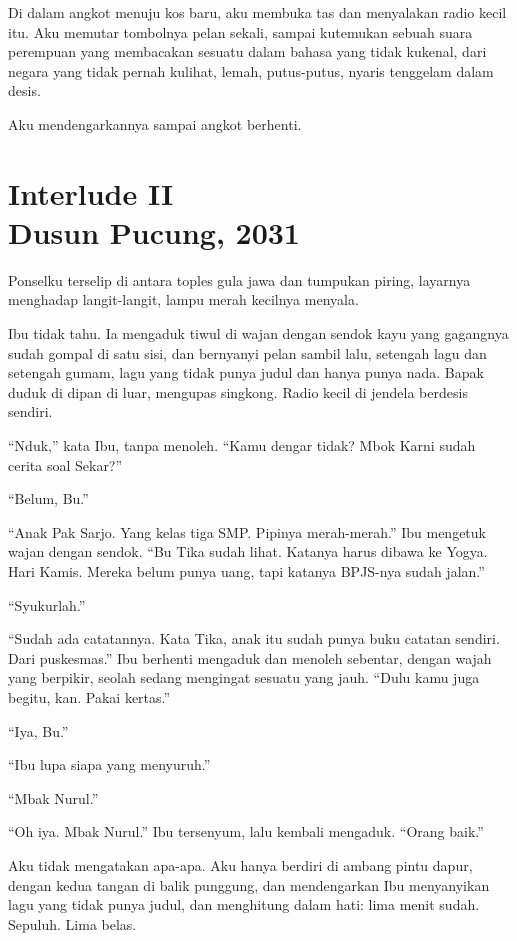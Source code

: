 \documentclass[11pt,twoside,openany]{book}
\begin{document}
Di dalam angkot menuju kos baru, aku membuka tas dan menyalakan radio kecil itu. Aku memutar tombolnya pelan sekali, sampai kutemukan sebuah suara perempuan yang membacakan sesuatu dalam bahasa yang tidak kukenal, dari negara yang tidak pernah kulihat, lemah, putus-putus, nyaris tenggelam dalam desis.

Aku mendengarkannya sampai angkot berhenti.

\chapter*{Interlude II\\[0.5em]\normalsize\upshape Dusun Pucung, 2031}
Ponselku terselip di antara toples gula jawa dan tumpukan piring, layarnya menghadap langit-langit, lampu merah kecilnya menyala.

Ibu tidak tahu. Ia mengaduk tiwul di wajan dengan sendok kayu yang gagangnya sudah gompal di satu sisi, dan bernyanyi pelan sambil lalu, setengah lagu dan setengah gumam, lagu yang tidak punya judul dan hanya punya nada. Bapak duduk di dipan di luar, mengupas singkong. Radio kecil di jendela berdesis sendiri.

``Nduk,'' kata Ibu, tanpa menoleh. ``Kamu dengar tidak? Mbok Karni sudah cerita soal Sekar?''

``Belum, Bu.''

``Anak Pak Sarjo. Yang kelas tiga SMP. Pipinya merah-merah.'' Ibu mengetuk wajan dengan sendok. ``Bu Tika sudah lihat. Katanya harus dibawa ke Yogya. Hari Kamis. Mereka belum punya uang, tapi katanya BPJS-nya sudah jalan.''

``Syukurlah.''

``Sudah ada catatannya. Kata Tika, anak itu sudah punya buku catatan sendiri. Dari puskesmas.'' Ibu berhenti mengaduk dan menoleh sebentar, dengan wajah yang berpikir, seolah sedang mengingat sesuatu yang jauh. ``Dulu kamu juga begitu, kan. Pakai kertas.''

``Iya, Bu.''

``Ibu lupa siapa yang menyuruh.''

``Mbak Nurul.''

``Oh iya. Mbak Nurul.'' Ibu tersenyum, lalu kembali mengaduk. ``Orang baik.''

Aku tidak mengatakan apa-apa. Aku hanya berdiri di ambang pintu dapur, dengan kedua tangan di balik punggung, dan mendengarkan Ibu menyanyikan lagu yang tidak punya judul, dan menghitung dalam hati: lima menit sudah. Sepuluh. Lima belas.
\end{document}

